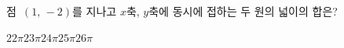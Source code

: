 점~$(1,\,-2)$를 지나고 $x$축, $y$축에 동시에 접하는 두 원의 넓이의 합은?
\begin{choices32}{$22\pi$}{$23\pi$}{$24\pi$}{$25\pi$}{$26\pi$}\end{choices32}
